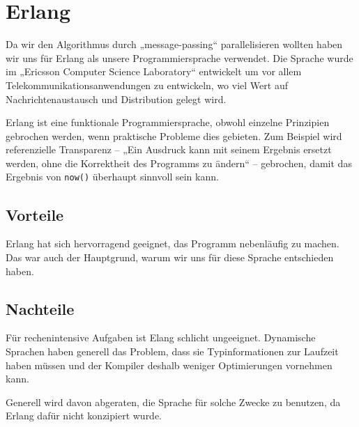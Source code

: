 \chapter{Erlang}
Da wir den Algorithmus durch „message-passing“ parallelisieren wollten
haben wir uns für Erlang als unsere Programmiersprache verwendet.  Die
Sprache wurde im „Ericsson Computer Science Laboratory“ entwickelt um
vor allem Telekommunikationsanwendungen zu entwickeln, wo viel Wert
auf Nachrichtenaustausch und Distribution gelegt wird.

Erlang ist eine funktionale Programmiersprache, obwohl einzelne
Prinzipien gebrochen werden, wenn praktische Probleme dies gebieten.
Zum Beispiel wird referenzielle Transparenz – „Ein Ausdruck kann mit
seinem Ergebnis ersetzt werden, ohne die Korrektheit des Programms zu
ändern“ – gebrochen, damit das Ergebnis von \texttt{now()} überhaupt
sinnvoll sein kann.

\section{Vorteile}
Erlang hat sich hervorragend geeignet, das Programm nebenläufig zu
machen.  Das war auch der Hauptgrund, warum wir uns für diese Sprache
entschieden haben.
\section{Nachteile}
Für rechenintensive Aufgaben ist Elang schlicht ungeeignet.
Dynamische Sprachen haben generell das Problem, dass sie
Typinformationen zur Laufzeit haben müssen und der Kompiler deshalb
weniger Optimierungen vornehmen kann.

Generell wird davon abgeraten, die Sprache für solche Zwecke zu
benutzen, da Erlang dafür nicht konzipiert wurde.
\cite[Kapitel~3]{lyse}
